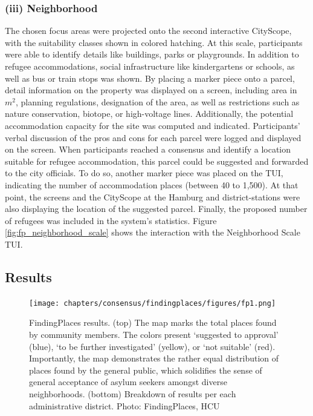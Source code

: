 {{        \subsubsection{(iii) Neighborhood}
        {
            The chosen focus areas were projected onto the second interactive CityScope, with the suitability classes shown in colored hatching. At this scale, participants were able to identify details like buildings, parks or playgrounds. In addition to refugee accommodations, social infrastructure like kindergartens or schools, as well as bus or train stops was shown. By placing a marker piece onto a parcel, detail information on the property was displayed on a screen, including area in $m^2$, planning regulations, designation of the area, as well as restrictions such as nature conservation, biotope, or high-voltage lines. Additionally, the potential accommodation capacity for the site was computed and indicated. Participants' verbal discussion of the pros and cons for each parcel were logged and displayed on the screen.
            \newline
            When participants reached a consensus and identify a location suitable for refugee accommodation, this parcel could be suggested and forwarded to the city officials. To do so, another marker piece was placed on the TUI, indicating the number of accommodation places (between 40 to 1,500). At that point, the screens and the CityScope at the Hamburg and district-stations were also displaying the location of the suggested parcel. Finally, the proposed number of refugees was included in the system's statistics. Figure \eqref{fig:fp_neighborhood_scale} shows the interaction with the Neighborhood Scale TUI.
        }
    }

    \subsection{Results}
    {

        \begin{figure}[!htb]
            \begin{center}
                \texttt{[image: chapters/consensus/findingplaces/figures/fp1.png]}
            \end{center}
            \caption{FindingPlaces results. (top) The map marks the total places found by community members. The colors present `suggested to approval' (blue), `to be further investigated' (yellow), or `not suitable' (red). Importantly, the map demonstrates the rather equal distribution of places found by the general public, which solidifies the sense of general acceptance of asylum seekers amongst diverse neighborhoods. (bottom) Breakdown of results per each administrative district. Photo: FindingPlaces, HCU}
            \label{fig:fp_results}
        \end{figure}

}}
